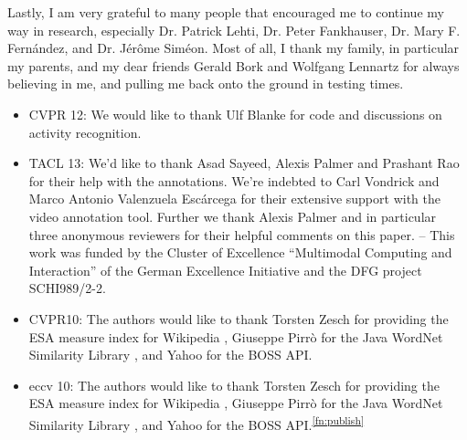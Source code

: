 Lastly, I am very grateful to many people that encouraged me to
continue my way in research, especially Dr. Patrick Lehti, Dr. Peter
Fankhauser, Dr. Mary F. Fern{\'a}ndez, and Dr. J{\'e}r{\^o}me
Sim{\'e}on. Most of all, I thank my family, in particular my parents,
and my dear friends Gerald Bork and Wolfgang Lennartz for always
believing in me, and pulling me back onto the ground in testing times.
\begin{itemize}
\item CVPR 12: We would like to thank Ulf Blanke for code and discussions on activity recognition.
\item TACL 13: We'd like to thank Asad Sayeed, Alexis Palmer and Prashant Rao for their help with the annotations.  We're indebted to Carl Vondrick and Marco Antonio Valenzuela Escárcega for their extensive support with the video annotation tool. Further we thank Alexis Palmer and in particular three anonymous reviewers for their helpful comments on this paper. -- This work was funded by the Cluster of Excellence ``Multimodal Computing and Interaction'' of the German Excellence Initiative and the DFG project SCHI989/2-2.
\item CVPR10: The authors would like to thank Torsten Zesch for
 providing the ESA measure index for Wikipedia \citep{zesch09jnle},
 Giuseppe Pirr{\`o} for the Java WordNet Similarity Library
 \citep{pirro08odbase}, and Yahoo for the BOSS API.
 \item eccv 10: The authors would like to thank Torsten Zesch for providing the ESA measure index for Wikipedia \cite{zesch09jnle}, Giuseppe Pirr{\`o} for the Java WordNet Similarity Library \cite{pirro08odbase}, and Yahoo for the BOSS API.\textsuperscript{\ref{fn:publish}}
\end{itemize}

